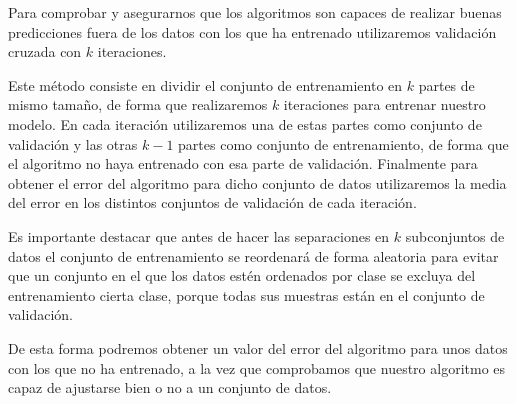 Para comprobar y asegurarnos que los algoritmos son capaces de realizar buenas predicciones fuera de los datos con los que ha entrenado utilizaremos validación cruzada con $k$ iteraciones.

Este método consiste en dividir el conjunto de entrenamiento en $k$ partes de mismo tamaño, de forma que realizaremos $k$ iteraciones para entrenar nuestro modelo. En cada iteración utilizaremos una de estas partes como conjunto de validación y las otras $k - 1$ partes como conjunto de entrenamiento, de forma que el algoritmo no haya entrenado con esa parte de validación. Finalmente para obtener el error del algoritmo para dicho conjunto de datos utilizaremos la media del error en los distintos conjuntos de validación de cada iteración.

Es importante destacar que antes de hacer las separaciones en $k$ subconjuntos de datos el conjunto de entrenamiento se reordenará de forma aleatoria para evitar que un conjunto en el que los datos estén ordenados por clase se excluya del entrenamiento cierta clase, porque todas sus muestras están en el conjunto de validación.

De esta forma podremos obtener un valor del error del algoritmo para unos datos con los que no ha entrenado, a la vez que comprobamos que nuestro algoritmo es capaz de ajustarse bien o no a un conjunto de datos.



